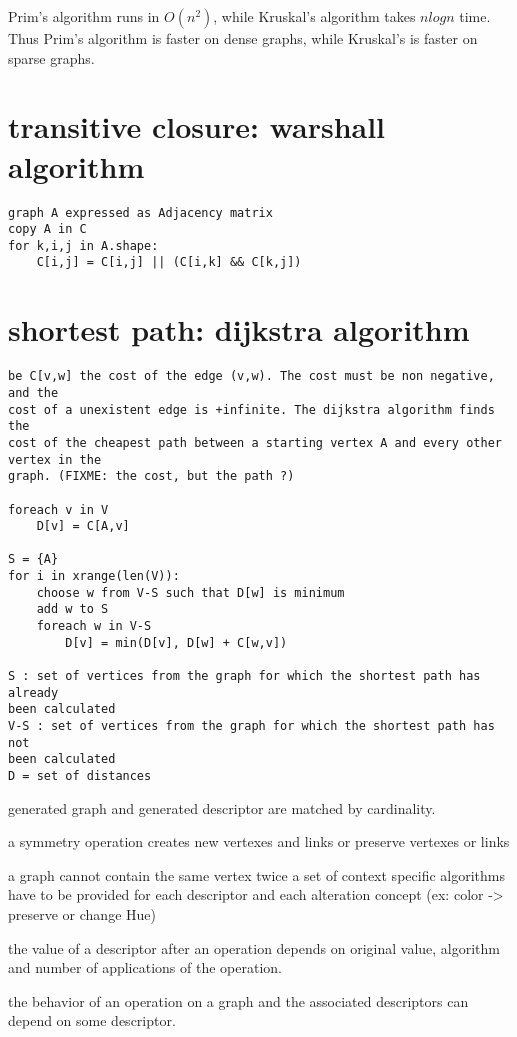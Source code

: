 \documentclass[a4paper,12pt,oneside]{book}
\begin{document}
Prim's algorithm runs in $O(n^2)$, while Kruskal's algorithm takes $n log n$
time. Thus Prim's algorithm is faster on dense graphs, while Kruskal's is
faster on sparse graphs. 

\section{transitive closure: warshall algorithm}

\begin{verbatim}
graph A expressed as Adjacency matrix 
copy A in C
for k,i,j in A.shape:
    C[i,j] = C[i,j] || (C[i,k] && C[k,j])
\end{verbatim}


\section{shortest path: dijkstra algorithm}

\begin{verbatim}
be C[v,w] the cost of the edge (v,w). The cost must be non negative, and the
cost of a unexistent edge is +infinite. The dijkstra algorithm finds the
cost of the cheapest path between a starting vertex A and every other vertex in the
graph. (FIXME: the cost, but the path ?)

foreach v in V
    D[v] = C[A,v]

S = {A}
for i in xrange(len(V)):
    choose w from V-S such that D[w] is minimum
    add w to S
    foreach w in V-S
        D[v] = min(D[v], D[w] + C[w,v])

S : set of vertices from the graph for which the shortest path has already
been calculated
V-S : set of vertices from the graph for which the shortest path has not
been calculated
D = set of distances 

\end{verbatim}

generated graph and generated descriptor are matched by cardinality.

a symmetry operation creates new vertexes and links or preserve vertexes or
links

a graph cannot contain the same vertex twice
a set of context specific algorithms have to be provided for each descriptor
and each alteration concept (ex: color -> preserve or change Hue)

the value of a descriptor after an operation depends on original value,
algorithm and number of applications of the operation.

the behavior of an operation on a graph and the associated descriptors can
depend on some descriptor.
\end{document}
